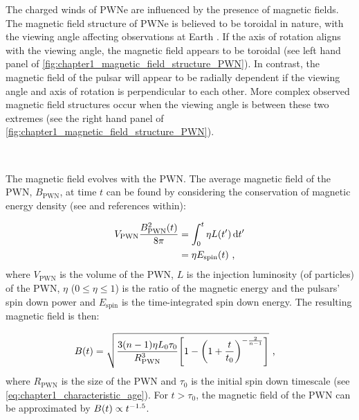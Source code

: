 The charged winds of PWNe are influenced by the presence of magnetic fields. The magnetic field structure of PWNe is believed to be toroidal in nature, with the viewing angle affecting observations at Earth \citep{2006ApJ...638..225K, 2012SSRv..166..231R}. If the axis of rotation aligns with the viewing angle, the magnetic field appears to be toroidal (see left hand panel of \autoref{fig:chapter1_magnetic_field_structure_PWN}). In contrast, the magnetic field of the pulsar will appear to be radially dependent if the viewing angle and axis of rotation is perpendicular to each other. More complex observed magnetic field structures occur when the viewing angle is between these two extremes (see the right hand panel of \autoref{fig:chapter1_magnetic_field_structure_PWN}).
\par~\par
The magnetic field evolves with the PWN. The average magnetic field of the PWN, $B_\text{PWN}$, at time $t$ can be found by considering the conservation of magnetic energy density (see \cite{2010ApJ...715.1248T} and references within):

\begin{equation}
    \begin{aligned}
    V_\text{PWN}\frac{B^2_\text{PWN}\qty(t)}{8\pi}&=\int_0^t\eta L\qty(t')\dd{t'} \\
    &=\eta E_\text{spin}\qty(t)\text{ ,}
    \end{aligned} \label{eq:chapter_1_magnetic_conservation_energy}
\end{equation}
\noindent where $V_\text{PWN}$ is the volume of the PWN, $L$ is the injection luminosity (of particles) of the PWN, $\eta$ ($0\leq\eta\leq 1$) is the ratio of the magnetic energy and the pulsars' spin down power and $E_\text{spin}$ is the time-integrated spin down energy. The resulting magnetic field is then:

\begin{equation}
    \begin{aligned}
    B\qty(t)&=\sqrt{\frac{3\qty(n-1)\eta L_0\tau_0}{R^3_\text{PWN}}\qty[1-\qty(1+\frac{t}{t_0})^{-\frac{2}{n-1}}]}\text{ ,}
    \end{aligned} \label{eq:chapter_1_magnetic_field_ev}
\end{equation}
\noindent where $R_\text{PWN}$ is the size of the PWN and $\tau_0$ is the initial spin down timescale (see \autoref{eq:chapter1_characteristic_age}). For $t>\tau_0$, the magnetic field of the PWN can be approximated by $B\qty(t)\propto t^{-1.5}$.

